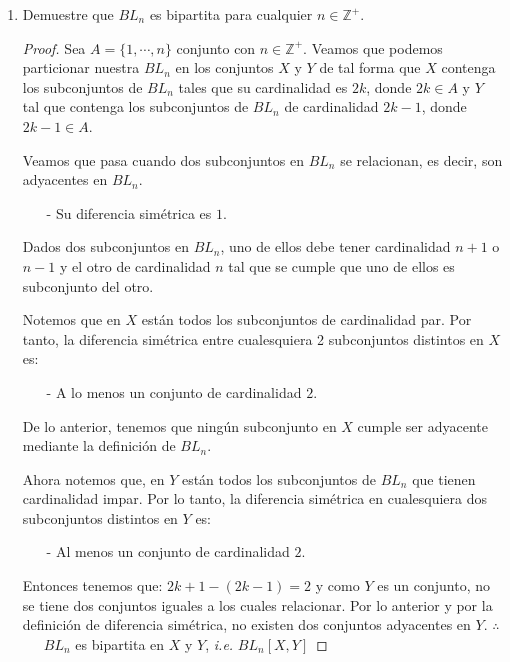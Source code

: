 \documentclass{article}
\begin{document}
\begin{enumerate}
\begin{enumerate}
    \item Demuestre que $BL_n$ es bipartita para cualquier $n \in \mathbb{Z}^+$. 
      
      \begin{proof}
        
        Sea $A = \{1, \dotsm,n\}$ conjunto con $n \in \mathbb{Z}^+$.     
        Veamos que podemos particionar nuestra $BL_n$ en los conjuntos
        $X$ y $Y$ de tal forma que $X$ contenga los subconjuntos de
        $BL_n$ tales que su cardinalidad es $2k$, donde $2k \in A$  y
        $Y$ tal que contenga los subconjuntos de $BL_n$ de cardinalidad
        $2k -1$, donde $2k -1 \in A$.
        
        Veamos que pasa cuando dos subconjuntos en $BL_n$ se relacionan,
        es decir, son adyacentes en $BL_n$.
        \begin{itemize}
        \item[-] Su diferencia simétrica es $1$.
        \end{itemize}
        Dados dos subconjuntos en $BL_n$, uno de ellos debe tener cardinalidad
        $n+1$ o $n-1$ y el otro de cardinalidad $n$ tal que se cumple que uno
        de ellos es subconjunto del otro.
        
        Notemos que en $X$ están todos los subconjuntos de cardinalidad par.
        Por tanto, la diferencia simétrica entre cualesquiera 2 subconjuntos
        distintos en $X$ es:
        \begin{itemize}
        \item[-] A lo menos un conjunto de cardinalidad $2$.
        \end{itemize}
        De lo anterior, tenemos que ningún subconjunto en
        $X$ cumple ser adyacente mediante la definición de $BL_n$.
        
        Ahora notemos que, en $Y$ están todos los subconjuntos de
        $BL_n$  que tienen cardinalidad impar. Por lo tanto, la
        diferencia simétrica en cualesquiera dos subconjuntos
        distintos en $Y$ es:
        \begin{itemize}
        \item[-] Al menos un conjunto de cardinalidad $2$.
        \end{itemize}
        Entonces tenemos que: $2k + 1 - (2k -1) = 2$ y como $Y$
        es un conjunto, no se tiene dos conjuntos iguales a los
        cuales relacionar. Por lo anterior y por la definición de
        diferencia simétrica, no existen dos conjuntos adyacentes
        en $Y$.
        \hspace*{3cm}  $\therefore$ \ \ \ $BL_n$ es bipartita en $X$ y $Y$, \textit{i.e.} $BL_n[X,Y]$
      \end{proof}
    \end{enumerate}
    

\end{enumerate}
\end{document}
